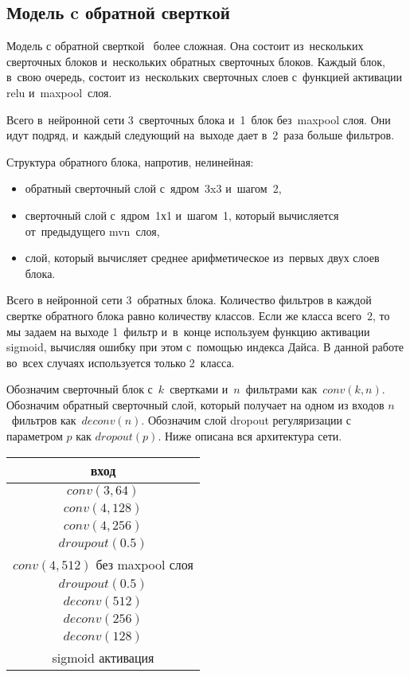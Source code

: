 \subsection{Модель c обратной сверткой}
 
Модель с обратной сверткой~\cite{fcn} более сложная. Она состоит из~нескольких сверточных блоков и~нескольких обратных сверточных блоков. Каждый блок, в~свою очередь, состоит из~нескольких сверточных слоев с~функцией активации relu и~maxpool~слоя. 

Всего в~нейронной сети 3~сверточных блока и~1~блок без~maxpool слоя. Они идут подряд, и~каждый следующий на~выходе дает в~2~раза больше фильтров. 

Структура обратного блока, напротив, нелинейная:

\begin{itemize}
  \item обратный сверточный слой с~ядром~3x3 и~шагом~2,
  \item сверточный слой с~ядром~1х1 и~шагом~1, который вычисляется от~предыдущего mvn~слоя,
  \item слой, который вычисляет среднее арифметическое из~первых двух слоев блока.
\end{itemize}

Всего в нейронной сети 3~обратных блока. Количество фильтров в каждой свертке обратного блока равно количеству классов. Если же класса всего~2, то мы задаем на выходе 1~фильтр и~в~конце используем функцию активации sigmoid, вычисляя ошибку при этом с~помощью индекса Дайса. В данной работе во~всех случаях используется только 2~класса.

Обозначим сверточный блок с~$k$~свертками и~$n$~фильтрами как~$conv(k,n)$. Обозначим обратный сверточный слой, который получает на одном из входов $n$~фильтров как~$deconv(n)$. Обозначим слой dropout регуляризации с параметром $p$ как $dropout(p)$. Ниже описана вся архитектура сети.

\begin{center}
  \begin{tabular}{ c }
    \hline
    вход                              \\ \hline
    $conv(3,64)$                      \\ \hline
    $conv(4,128)$                     \\ \hline
    $conv(4,256)$                     \\ \hline
    $droupout(0.5)$                   \\ \hline
    $conv(4,512)$ без maxpool слоя    \\ \hline
    $droupout(0.5)$                   \\ \hline
    $deconv(512)$                     \\ \hline
    $deconv(256)$                     \\ \hline  
    $deconv(128)$                     \\ \hline      
    sigmoid активация                 \\
    \hline
  \end{tabular}
\end{center}

